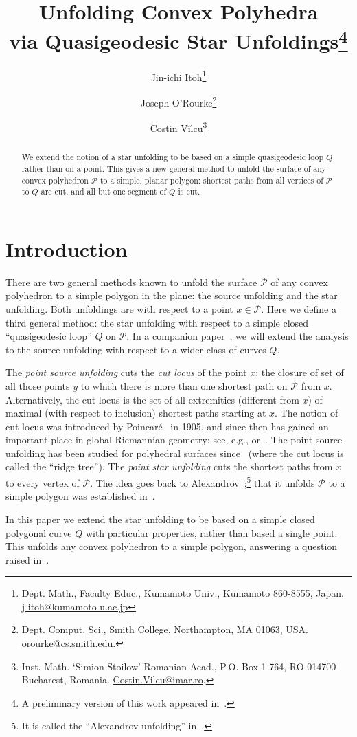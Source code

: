 \pdfoutput=1  \documentclass[]{article}
\title{
Unfolding Convex Polyhedra \\ 
via
Quasigeodesic Star Unfoldings\footnote{
   A preliminary version of this work appeared
   in~\cite{iov-ucpq-07,iov-ucpq-07a}.
}
}
\author{Jin-ichi Itoh\thanks{Dept. Math.,
	Faculty Educ., Kumamoto Univ.,
	Kumamoto 860-8555, Japan.
    \protect\url{j-itoh@kumamoto-u.ac.jp}}
\and
Joseph O'Rourke\thanks{Dept. Comput. Sci., Smith College, Northampton, MA
      01063, USA.
      \protect\url{orourke@cs.smith.edu}.}
\and
Costin V\^{i}lcu\thanks{Inst. Math. `Simion Stoilow' Romanian Acad.,
P.O. Box 1-764,
RO-014700 Bucharest, Romania.
    \protect\url{Costin.Vilcu@imar.ro}.}
}
\def\P{{\mathcal P}}
\begin{document}
\maketitle

\begin{abstract}
We extend the notion of a star unfolding to be based on
a simple quasigeodesic loop $Q$ rather than on a point.
This gives a new general method to unfold the surface of any convex polyhedron
$\P$ to a simple, planar polygon: shortest paths
from all vertices of $\P$ to $Q$ are cut, and all but one
segment of $Q$ is cut.
\end{abstract}

\section{Introduction}

There are two general methods known to unfold the surface $\P$ 
of any convex polyhedron
to a simple polygon in the plane:
the source unfolding and the star unfolding.
Both unfoldings are with respect to a point $x \in \P$.
Here we define a third general method:
the star unfolding
with respect to a
simple closed ``quasigeodesic loop'' $Q$ on $\P$.
In a companion paper~\cite{iov-ucpqsu-08b}, we 
will extend the analysis
to the source unfolding with respect to a wider class of curves $Q$.


The \emph{point source unfolding} cuts the \emph{cut locus} of
the point $x$:
the closure of set of all those points $y$ to which there is
more than one shortest path on $\P$ from $x$.
Alternatively, the cut locus is the set of all extremities
(different from $x$) of maximal (with respect to inclusion) shortest paths
starting at $x$.
The notion of cut locus was introduced by 
Poincar\'e~\cite{p-lgsc-1905}
in 1905, and since then has gained an
important place in global Riemannian geometry; see, e.g., 
\cite{k-ccl-67} or~\cite{s-rg-96}.
The point source unfolding has been studied
for polyhedral surfaces since~\cite{ss-spps-86} (where the cut locus is called the ``ridge tree'').
The \emph{point star unfolding} cuts the shortest paths from $x$ to every
vertex of $\P$.
The idea goes back to Alexandrov~\cite[p.~181]{a-kp-48};\footnote{
   It is called the ``Alexandrov unfolding'' in~\cite{mp-mccpc-05}.
}
that it unfolds $\P$ to a simple polygon was established
in~\cite{ao-nsu-92}.

In this paper we extend the star unfolding to be based on a
simple closed polygonal curve $Q$ with particular properties,
rather than based a single point.
This unfolds any convex polyhedron to a simple polygon,
answering a question
raised in~\cite[p.~307]{do-gfalop-07}.
\end{document}
